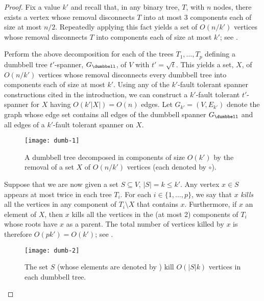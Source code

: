\documentclass{patmorin}
\begin{document}
\begin{proof} 
  Fix a value $k'$ and recall that, in any binary tree, $T$, with $n$
  nodes, there exists a vertex whose removal disconnects $T$ into at
  most 3 components each of size at most $n/2$.  Repeatedly applying this
  fact yields a set of $O(n/k')$ vertices whose removal disconnects $T$
  into components each of size at most $k'$; see .

  Perform the above decomposition for each of the trees $T_1,\ldots,T_p$
  defining a dumbbell tree $t'$-spanner, $G_\dumbbell$, of $V$ with
  $t'=\sqrt{t}$.  This yields a set, $X$, of $O(n/k')$ vertices
  whose removal disconnects every dumbbell tree into components
  each of size at most $k'$.  Using any of the $k'$-fault tolerant
  spanner constructions cited in the introduction, we can construct a
  $k'$-fault tolerant $t'$-spanner for $X$ having $O(k'|X|)=O(n)$ edges.
  Let $G_{k'}=(V,E_{k'})$ denote the graph whose edge set contains
  all edges of the dumbbell spanner $G_\dumbbell$ and all edges of a
  $k'$-fault tolerant spanner on $X$.

  \begin{figure}
    \begin{center}
      \texttt{[image: dumb-1]}
    \end{center}
    \caption{A dumbbell tree decomposed in components of size $O(k')$
    by the removal of a set $X$ of $O(n/k')$ vertices (each denoted
    by $\circ$).}
  \end{figure}
  
  Suppose that we are now given a set $S\subseteq V$, $|S|=k\le k'$.
  Any vertex $x\in S$ appears at most twice in each tree $T_i$.  For each
  $i\in\{1,\ldots,p\}$, we say that $x$ \emph{kills} all the vertices
  in any component of $T_i\setminus X$ that contains $x$.  Furthermore,
  if $x$ an element of $X$, then $x$ kills all the vertices in the
  (at most 2) components of $T_i$ whose roots have $x$ as a parent.
  The total number of vertices killed by $x$ is therefore $O(pk')=O(k')$;
  see .

  \begin{figure}
    \begin{center}
      \texttt{[image: dumb-2]}
    \end{center}
    \caption{The set $S$ (whose elements are denoted by \textbullet) kill
      $O(|S|k)$ vertices in each dumbbell tree.}
  \end{figure}
  

\end{proof}
\end{document}
